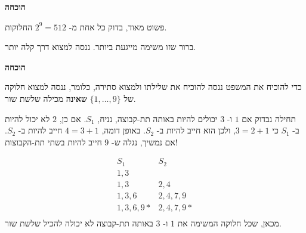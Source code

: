 \documentclass[12pt,a4paper]{article}
\begin{document}
\textbf{הוכחה}

פשוט מאוד, בדוק כל אחת מ-%
$2^9=512$
החלוקות.

ברור שזו משימה מייגעת ביותר. ננסה למצוא דרך קלה יותר.

\textbf{הוכחה}

כדי להוכיח את המשפט ננסה להוכיח את שלילתו ולמצוא סתירה, כלומר, ננסה למצוא חלוקה של 
$\{1,\ldots,9\}$
\textbf{שאינה}
מכילה שלשת שור.

תחילה נבדוק אם 
$1$
ו-%
$3$
יכולים להיות באותה תת-קבוצה, נניח, 
$S_1$.
אם כן, 
$2$
לא יכול להיות ב-%
$S_1$
כי
$3=2+1$, 
ולכן הוא חייב להיות ב-%
$S_2$.
באופן דומה,
$4=3+1$
חייב להיות ב-%
$S_2$.
אם נמשיך, נגלה ש-%
$9$
חייב להיות בשתי תת-הקבוצות!

\begin{displaymath}
\begin{array}{ll}
S_1 & S_2\\
1,3 & \\
1,3 & 2,4\\
1,3,6 & 2,4,7,9\\
1,3,6,9* & 2,4,7,9*\\
\end{array}
\end{displaymath}
מכאן, שכל חלוקה המשימה את
$1$
ו-%
$3$
באותה תת-קבוצה לא יכולה להכיל שלשת שור.
\end{document}
